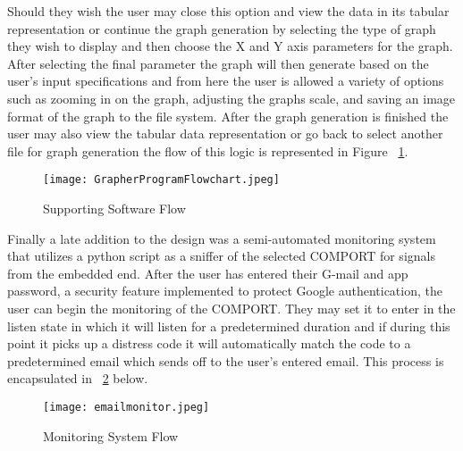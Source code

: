 \documentclass[comsoc, 12pt]{IEEEtran}
\begin{document}
Should they wish the user may close this option and view the data in its tabular representation or continue the graph generation by selecting the type of graph they wish to display and then choose the X and Y axis parameters for the graph. After selecting the final parameter the graph will then generate based on the user's input specifications and from here the user is allowed a variety of options such as zooming in on the graph, adjusting the graphs scale, and saving an image format of the graph to the file system. After the graph generation is finished the user may also view the tabular data representation or go back to select another file for graph generation the flow of this logic is represented in Figure ~\ref{fig:graphflow}.  
\begin{figure}[H]
\centering
\texttt{[image: GrapherProgramFlowchart.jpeg]}
\centering
\caption{Supporting Software Flow}
 \label{fig:graphflow}
\end{figure}
Finally a late addition to the design was a semi-automated monitoring system that utilizes a python script as a sniffer of the selected COMPORT for signals from the embedded end. After the user has entered their G-mail and app password, a security feature implemented to protect Google authentication, the user can begin the monitoring of the COMPORT. They may set it to enter in the listen state in which it will listen for a predetermined duration and if during this point it picks up a distress code it will automatically match the code to a predetermined email which sends off to the user's entered email. This process is encapsulated in ~\ref{fig:monitorflow} below.
\begin{figure}[H]
\centering
\texttt{[image: emailmonitor.jpeg]}
\centering
\caption{Monitoring System Flow}
 \label{fig:monitorflow}
\end{figure}
\end{document}
